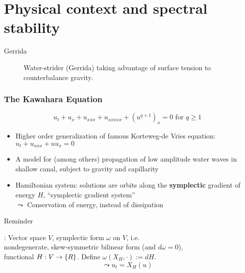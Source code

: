 \documentclass[9pt, english]{beamer}
\theoremstyle{definition}
\begin{document}

\section{Physical context and spectral stability}


\begin{frame}{Gerrida}
\begin{figure}\label{fig:gerrida}
        \caption{Water-strider (Gerrida) taking advantage of surface tension
        to counterbalance gravity.}
        \end{figure}
\end{frame}


\begin{frame}
  \frametitle{The Kawahara Equation}
  \begin{block}{}
  $$u_t + u_x + u_{xxx} + u_{xxxxx} + (u^{q+1})_x = 0 \mbox{ for } q\ge 1$$
  \end{block}
  \begin{itemize}
   \item Higher order generalization of famous Korteweg-de Vries equation:\\ \hspace{2.5cm} $u_t + u_{xxx} + uu_x = 0$
   \item A model for (among others) propagation of low amplitude water waves in shallow canal, subject to gravity and
capillarity
   \item Hamiltonian system: solutions are orbits along the {\bf symplectic} gradient of
energy $H$, ``symplectic gradient system''\\
$\leadsto$ Conservation of energy, instead of dissipation
  \end{itemize}
\begin{block}{}
{\begin{bf} Reminder\end{bf}}: Vector space $V$, symplectic form $\omega$ on $V$, i.e.\\
\vspace{0.15cm}
\hspace{0.5cm} nondegenerate, skew-symmetric bilinear form (and $d\omega=0$),\\
\vspace{0.15cm} functional $H: V\rightarrow {\{{R}\}}$. Define
$\omega(X_H,\cdot) := dH$.
$$\leadsto u_t=X_H(u)$$
\end{block}
\end{frame}
\end{document}
